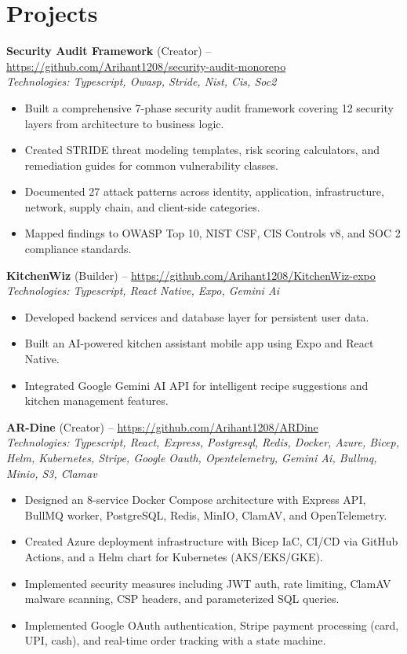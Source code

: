 \documentclass[11pt,a4paper]{article}
\begin{document}
\section{Projects}
\textbf{Security Audit Framework} (Creator) -- \href{https://github.com/Arihant1208/security-audit-monorepo}{https://github.com/Arihant1208/security-audit-monorepo}
\\ \textit{Technologies: Typescript, Owasp, Stride, Nist, Cis, Soc2}
\begin{itemize}
  \item Built a comprehensive 7-phase security audit framework covering 12 security layers from architecture to business logic.
  \item Created STRIDE threat modeling templates, risk scoring calculators, and remediation guides for common vulnerability classes.
  \item Documented 27 attack patterns across identity, application, infrastructure, network, supply chain, and client-side categories.
  \item Mapped findings to OWASP Top 10, NIST CSF, CIS Controls v8, and SOC 2 compliance standards.
\end{itemize}
\vspace{2pt}
\textbf{KitchenWiz} (Builder) -- \href{https://github.com/Arihant1208/KitchenWiz-expo}{https://github.com/Arihant1208/KitchenWiz-expo}
\\ \textit{Technologies: Typescript, React Native, Expo, Gemini Ai}
\begin{itemize}
  \item Developed backend services and database layer for persistent user data.
  \item Built an AI-powered kitchen assistant mobile app using Expo and React Native.
  \item Integrated Google Gemini AI API for intelligent recipe suggestions and kitchen management features.
\end{itemize}
\vspace{2pt}
\textbf{AR-Dine} (Creator) -- \href{https://github.com/Arihant1208/ARDine}{https://github.com/Arihant1208/ARDine}
\\ \textit{Technologies: Typescript, React, Express, Postgresql, Redis, Docker, Azure, Bicep, Helm, Kubernetes, Stripe, Google Oauth, Opentelemetry, Gemini Ai, Bullmq, Minio, S3, Clamav}
\begin{itemize}
  \item Designed an 8-service Docker Compose architecture with Express API, BullMQ worker, PostgreSQL, Redis, MinIO, ClamAV, and OpenTelemetry.
  \item Created Azure deployment infrastructure with Bicep IaC, CI/CD via GitHub Actions, and a Helm chart for Kubernetes (AKS/EKS/GKE).
  \item Implemented security measures including JWT auth, rate limiting, ClamAV malware scanning, CSP headers, and parameterized SQL queries.
  \item Implemented Google OAuth authentication, Stripe payment processing (card, UPI, cash), and real-time order tracking with a state machine.
\end{itemize}
\vspace{2pt}
\end{document}
